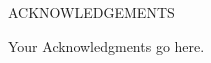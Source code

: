 \label{chap:acknowledgements}

\begin{center}
  \uppercase{Acknowledgements}
\end{center}

\bigskip


Your Acknowledgments go here. 


\newpage